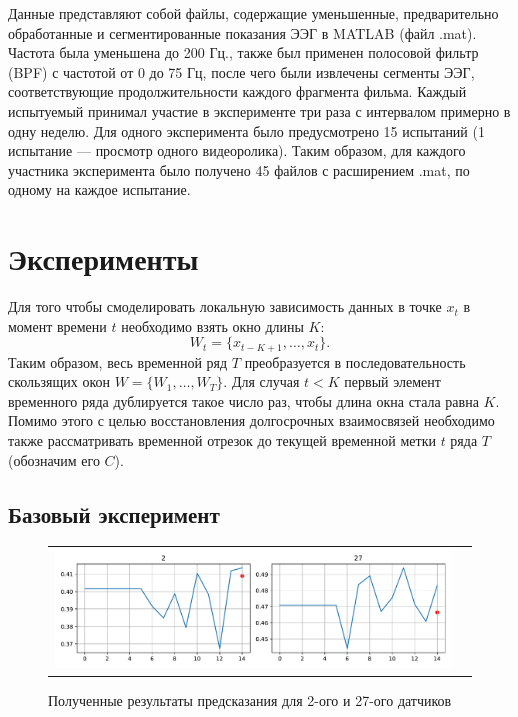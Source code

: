 \documentclass{article}
\begin{document}
Данные представляют собой файлы, содержащие уменьшенные, предварительно обработанные и сегментированные показания ЭЭГ в MATLAB (файл .mat). Частота была уменьшена до 200 Гц., также был применен полосовой фильтр (BPF) с частотой от 0 до 75 Гц, после чего были извлечены сегменты ЭЭГ, соответствующие продолжительности каждого фрагмента фильма. 
Каждый испытуемый принимал участие в эксперименте три раза с интервалом примерно в одну неделю. Для одного эксперимента было предусмотрено 15 испытаний (1 испытание — просмотр одного видеоролика). Таким образом, для каждого участника эксперимента было получено 45 файлов с расширением .mat, по одному на каждое испытание. 

\section{Эксперименты}
Для того чтобы смоделировать локальную зависимость данных в точке $x_t$ в момент времени $t$ необходимо взять окно длины $K$: 
$$
W_t = \{x_{t - K + 1}, \dots, x_t\}.
$$
Таким образом, весь временной ряд $\textit{T}$ преобразуется в последовательность скользящих окон $\textit{W} = \{W_1, \dots, W_T\}$. Для случая $t < K$ первый элемент временного ряда дублируется такое число раз, чтобы длина окна стала равна $K$. Помимо этого с целью восстановления долгосрочных взаимосвязей необходимо также рассматривать временной отрезок до текущей временной метки $t$ ряда $\textit{T}$ (обозначим его $C$).
\subsection{Базовый эксперимент}
\begin{figure}[h]
\begin{tabular}{cc}
  \includegraphics[width=160mm]{5.pdf} 
\end{tabular}
\caption{Полученные результаты предсказания для 2-ого и 27-ого датчиков}
\label{fig:base}
\end{figure}
\end{document}

